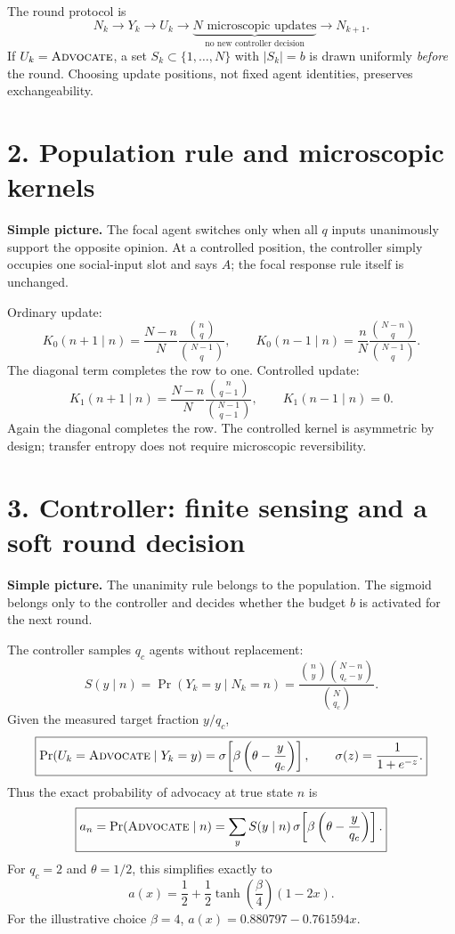 \documentclass[9pt]{extarticle}
\newcommand{\Adv}{\textsc{Advocate}}
\begin{document}
The round protocol is
\[
\boxed{N_k\to Y_k\to U_k\to \underbrace{N\text{ microscopic updates}}_{\text{no new controller decision}}\to N_{k+1}.}
\]
If $U_k=\Adv$, a set $S_k\subset\{1,\ldots,N\}$ with $|S_k|=b$ is drawn uniformly \emph{before} the round. Choosing update positions, not fixed agent identities, preserves exchangeability.

\section*{2. Population rule and microscopic kernels}
\textbf{Simple picture.} The focal agent switches only when all $q$ inputs unanimously support the opposite opinion. At a controlled position, the controller simply occupies one social-input slot and says $A$; the focal response rule itself is unchanged.

Ordinary update:
\[
\boxed{K_0(n+1\mid n)=\frac{N-n}{N}\frac{\binom{n}{q}}{\binom{N-1}{q}},\qquad
K_0(n-1\mid n)=\frac{n}{N}\frac{\binom{N-n}{q}}{\binom{N-1}{q}}.}
\]
The diagonal term completes the row to one. Controlled update:
\[
\boxed{K_1(n+1\mid n)=\frac{N-n}{N}\frac{\binom{n}{q-1}}{\binom{N-1}{q-1}},\qquad K_1(n-1\mid n)=0.}
\]
Again the diagonal completes the row. The controlled kernel is asymmetric by design; transfer entropy does not require microscopic reversibility.

\newpage
\section*{3. Controller: finite sensing and a soft round decision}
\textbf{Simple picture.} The unanimity rule belongs to the population. The sigmoid belongs only to the controller and decides whether the budget $b$ is activated for the next round.

The controller samples $q_c$ agents without replacement:
\[
\boxed{S(y\mid n)=\Pr(Y_k=y\mid N_k=n)=\frac{\binom{n}{y}\binom{N-n}{q_c-y}}{\binom{N}{q_c}}.}
\]
Given the measured target fraction $y/q_c$,
\[
\boxed{\Pr(U_k=\Adv\mid Y_k=y)=\sigma\!\left[\beta\left(\theta-\frac{y}{q_c}\right)\right],\qquad \sigma(z)=\frac{1}{1+e^{-z}}.}
\]
Thus the exact probability of advocacy at true state $n$ is
\[
\boxed{a_n=\Pr(\Adv\mid n)=\sum_y S(y\mid n)\,\sigma\!\left[\beta\left(\theta-\frac{y}{q_c}\right)\right].}
\]
For $q_c=2$ and $\theta=1/2$, this simplifies exactly to
\[
\boxed{a(x)=\frac12+\frac12\tanh\!\left(\frac{\beta}{4}\right)(1-2x).}
\]
For the illustrative choice $\beta=4$, $a(x)=0.880797-0.761594x$.
\end{document}
